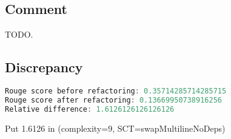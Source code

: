 \documentclass[11pt]{article}
\begin{document}
  \subsection{Comment}

  TODO.

  \subsection{Discrepancy}

  \begin{lstlisting}[language=java]
Rouge score before refactoring: 0.35714285714285715
Rouge score after refactoring: 0.13669950738916256
Relative difference: 1.6126126126126126
  \end{lstlisting}

  Put 1.6126 in (complexity=9, SCT=swapMultilineNoDeps)
\end{document}
